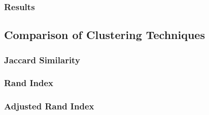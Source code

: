 \documentclass[12pt]{article}
\begin{document}
\subsubsection{Results}

\subsection{Comparison of Clustering Techniques}
\subsubsection{Jaccard Similarity}

\subsubsection{Rand Index}

\subsubsection{Adjusted Rand Index}
\end{document}

